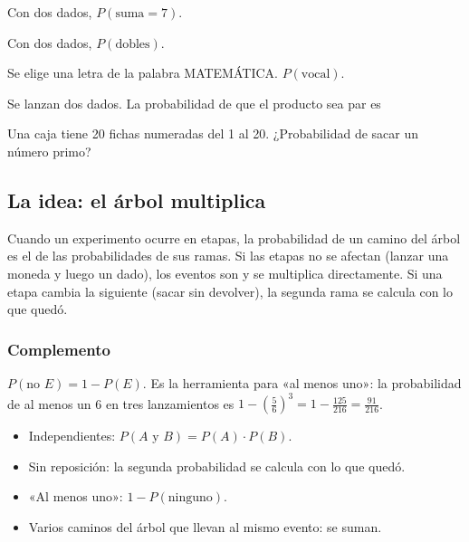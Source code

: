 \taller
{}
\begin{ejercicios}
\item Con dos dados, $P(\text{suma} = 7)$. 
\item Con dos dados, $P(\text{dobles})$. 
\item Se elige una letra de la palabra MATEMÁTICA. $P(\text{vocal})$. 
\end{ejercicios}
\begin{ejercicios}
\item Se lanzan dos dados. La probabilidad de que el producto sea par es
\item Una caja tiene 20 fichas numeradas del 1 al 20. ¿Probabilidad de sacar un número primo?
\end{ejercicios}

\bitacora


\subsection{La idea: el árbol multiplica}
Cuando un experimento ocurre en etapas, la probabilidad de un camino del árbol es el  de las
probabilidades de sus ramas. Si las etapas no se afectan (lanzar una moneda y luego un dado), los eventos son
 y se multiplica directamente. Si una etapa cambia la siguiente (sacar sin devolver), la segunda
rama se calcula con lo que quedó.


\subsubsection{Complemento}
$P(\text{no } E) = 1 - P(E)$. Es la herramienta para «al menos uno»: la probabilidad de al menos un 6 en tres lanzamientos
es $1 - \left(\tfrac56\right)^3 = 1 - \tfrac{125}{216} = \tfrac{91}{216}$.

\begin{regla}
\begin{itemize}
  \item Independientes: $P(A \text{ y } B) = P(A)\cdot P(B)$.
  \item Sin reposición: la segunda probabilidad se calcula con lo que quedó.
  \item «Al menos uno»: $1 - P(\text{ninguno})$.
  \item Varios caminos del árbol que llevan al mismo evento: se suman.
\end{itemize}
\end{regla}

